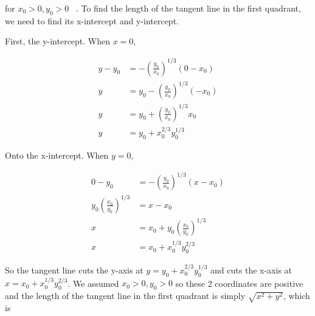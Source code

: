 \documentclass[9pt]{article}
\begin{document}
for $x_0 > 0, y_0 > 0$ \ . To find the length of the tangent line in the first quadrant, we need to find its x-intercept and y-intercept.

First, the y-intercept. When $x = 0$,

\begin{align*}
  y - y_0 &= -(\frac{y_0}{x_0})^{1/3} (0 - x_0) \\
  y &= y_0 -(\frac{y_0}{x_0})^{1/3} (- x_0) \\
  y &= y_0 + (\frac{y_0}{x_0})^{1/3} x_0 \\
  y &= y_0 + x_0^{2/3} y_0^{1/3}
\end{align*}

Onto the x-intercept. When $y = 0$,

\begin{align*}
  0 - y_0 &= -(\frac{y_0}{x_0})^{1/3}(x - x_0) \\
  y_0 (\frac{x_0}{y_0})^{1/3} &= x - x_0 \\
  x &= x_0 + y_0(\frac{x_0}{y_0})^{1/3} \\
  x &= x_0 + x_0^{1/3} y_0^{2/3}
\end{align*}

So the tangent line cuts the y-axis at $y = y_0 + x_0^{2/3} y_0^{1/3}$ and cuts the x-axis at $x = x_0 + x_0^{1/3} y_0^{2/3}$. We assumed $x_0 > 0, y_0 > 0$ so these 2 coordinates are positive and the length of the tangent line in the first quadrant is simply $\sqrt{x^2 + y^2}$, which is
\end{document}
